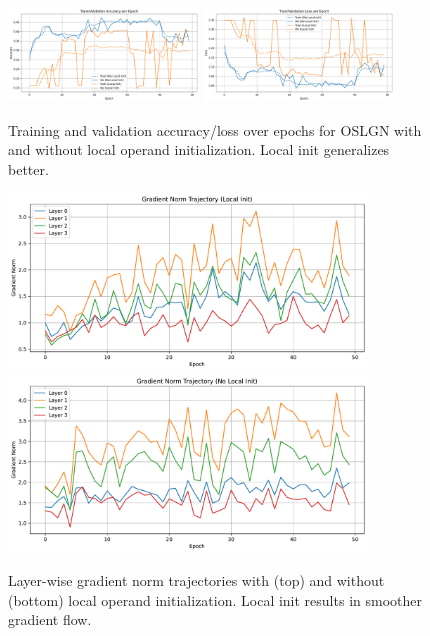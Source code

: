 \begin{figure}[H]
    \centering
    \includegraphics[width=0.45\textwidth]{figures/small_world/accuracy.pdf}
    \includegraphics[width=0.45\textwidth]{figures/small_world/loss.pdf}
    \caption{Training and validation accuracy/loss over epochs for OSLGN with and without local operand initialization. Local init generalizes better.}
    \label{fig:smallworld_acc}
\end{figure}

\begin{figure}[H]
    \centering
    \includegraphics[width=0.85\textwidth]{figures/small_world/gradnorm_lineplot_localinit_on.pdf} \\
    \includegraphics[width=0.85\textwidth]{figures/small_world/gradnorm_lineplot_localinit_off.pdf}
    \caption{Layer-wise gradient norm trajectories with (top) and without (bottom) local operand initialization. Local init results in smoother gradient flow.}
    \label{fig:smallworld_gradnorm}
\end{figure}

